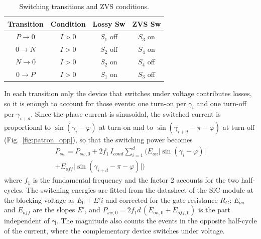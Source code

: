 \documentclass[conference]{IEEEtran}
\newcommand{\gv}{\boldsymbol{\gamma}}
\newcommand{\old}[1]{\par\smallskip\noindent{\color{gray}\footnotesize
    \textbf{[ANTES]} #1}\par\smallskip}
\renewcommand{\old}[1]{}       %
\begin{document}
\begin{table}[!t]
    \centering
    \caption{Switching transitions and ZVS conditions.}
    \bgroup
    \def\arraystretch{1.0}
    \begin{tabular*}{\columnwidth}{@{\extracolsep{\fill}}cccc@{}}
        \toprule
        \rowcolor{Gray}
        Transition & Condition & Lossy Sw & ZVS Sw \\
        \midrule
        $P \rightarrow 0$ & $I > 0$ & $S_1$ off & $S_3$ on \\
        $0 \rightarrow N$ & $I > 0$ & $S_2$ off & $S_4$ on \\
        $N \rightarrow 0$ & $I > 0$ & $S_2$ on  & $S_4$ off \\
        $0 \rightarrow P$ & $I > 0$ & $S_1$ on  & $S_3$ off \\
        \bottomrule
    \end{tabular*}
    \egroup
    \label{tab:transiciones_zvs}
\end{table}

In each transition only the device that switches under voltage contributes
losses, so it is enough to account for those events: one turn-on per $\gamma_i$
and one turn-off per $\gamma_{i+d}$. Since the phase current is sinusoidal, the switched current is proportional to $\sin(\gamma_i-\varphi)$ at turn-on and to $\sin(\gamma_{i+d}-\pi-\varphi)$ at
turn-off (Fig.~\ref{fig:patron_opp}), so that the switching power becomes
\begin{multline}
    P_{sw} = P_{sw,0} + 2f_1\,I_{cond}\sum_{i=1}^{d}
        \Big( E_{on}\big|\sin(\gamma_i-\varphi)\big| \\
            + E_{off}\big|\sin(\gamma_{i+d}-\pi-\varphi)\big|\Big)
    \label{eq:p_sw}
\end{multline}
where $f_1$ is the fundamental frequency and the factor 2 accounts for the
two half-cycles. The switching energies are fitted from the datasheet of the
SiC module at the blocking voltage as $E_0+E'i$ and corrected for the gate
resistance $R_G$: $E_{on}$ and $E_{off}$ are the slopes $E'$, and
$P_{sw,0}=2f_1d\,(E_{on,0}+E_{off,0})$ is the part independent of $\gv$.
The magnitude also counts the events in the opposite half-cycle of the
current, where the complementary device switches under voltage.
\old{\[
    P_{sw} = f_1\,I_{cond}\sum_{i=1}^{d}
        \Big( E_{on}\sin(\gamma_i-\varphi)
            + E_{off}\sin(\gamma_{i+d}-\pi-\varphi)\Big)
\]
where $f_1$ is the fundamental frequency, which turns the energy dissipated per
period into power, $I_{cond}$ is the current amplitude corresponding to the
modulation index under consideration, and $E_{on}$, $E_{off}$ are the switching
energies from the datasheet of the SiC module, evaluated at the blocking voltage
and normalized per ampere. With this, \eqref{eq:p_sw} is continuous and
differentiable in $\gv$.}
\end{document}
